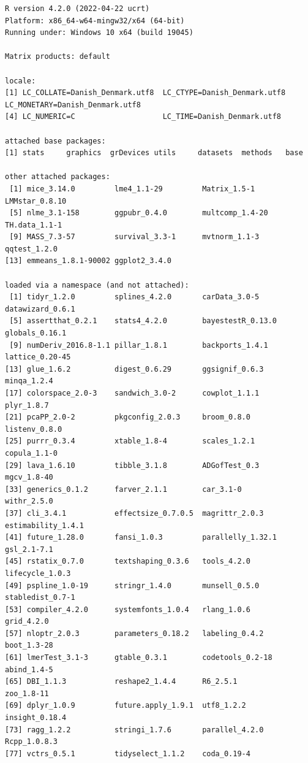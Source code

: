 \documentclass[12pt]{article}
\begin{document}
\begin{verbatim}
R version 4.2.0 (2022-04-22 ucrt)
Platform: x86_64-w64-mingw32/x64 (64-bit)
Running under: Windows 10 x64 (build 19045)

Matrix products: default

locale:
[1] LC_COLLATE=Danish_Denmark.utf8  LC_CTYPE=Danish_Denmark.utf8    LC_MONETARY=Danish_Denmark.utf8
[4] LC_NUMERIC=C                    LC_TIME=Danish_Denmark.utf8    

attached base packages:
[1] stats     graphics  grDevices utils     datasets  methods   base     

other attached packages:
 [1] mice_3.14.0         lme4_1.1-29         Matrix_1.5-1        LMMstar_0.8.10     
 [5] nlme_3.1-158        ggpubr_0.4.0        multcomp_1.4-20     TH.data_1.1-1      
 [9] MASS_7.3-57         survival_3.3-1      mvtnorm_1.1-3       qqtest_1.2.0       
[13] emmeans_1.8.1-90002 ggplot2_3.4.0      

loaded via a namespace (and not attached):
 [1] tidyr_1.2.0         splines_4.2.0       carData_3.0-5       datawizard_0.6.1   
 [5] assertthat_0.2.1    stats4_4.2.0        bayestestR_0.13.0   globals_0.16.1     
 [9] numDeriv_2016.8-1.1 pillar_1.8.1        backports_1.4.1     lattice_0.20-45    
[13] glue_1.6.2          digest_0.6.29       ggsignif_0.6.3      minqa_1.2.4        
[17] colorspace_2.0-3    sandwich_3.0-2      cowplot_1.1.1       plyr_1.8.7         
[21] pcaPP_2.0-2         pkgconfig_2.0.3     broom_0.8.0         listenv_0.8.0      
[25] purrr_0.3.4         xtable_1.8-4        scales_1.2.1        copula_1.1-0       
[29] lava_1.6.10         tibble_3.1.8        ADGofTest_0.3       mgcv_1.8-40        
[33] generics_0.1.2      farver_2.1.1        car_3.1-0           withr_2.5.0        
[37] cli_3.4.1           effectsize_0.7.0.5  magrittr_2.0.3      estimability_1.4.1 
[41] future_1.28.0       fansi_1.0.3         parallelly_1.32.1   gsl_2.1-7.1        
[45] rstatix_0.7.0       textshaping_0.3.6   tools_4.2.0         lifecycle_1.0.3    
[49] pspline_1.0-19      stringr_1.4.0       munsell_0.5.0       stabledist_0.7-1   
[53] compiler_4.2.0      systemfonts_1.0.4   rlang_1.0.6         grid_4.2.0         
[57] nloptr_2.0.3        parameters_0.18.2   labeling_0.4.2      boot_1.3-28        
[61] lmerTest_3.1-3      gtable_0.3.1        codetools_0.2-18    abind_1.4-5        
[65] DBI_1.1.3           reshape2_1.4.4      R6_2.5.1            zoo_1.8-11         
[69] dplyr_1.0.9         future.apply_1.9.1  utf8_1.2.2          insight_0.18.4     
[73] ragg_1.2.2          stringi_1.7.6       parallel_4.2.0      Rcpp_1.0.8.3       
[77] vctrs_0.5.1         tidyselect_1.1.2    coda_0.19-4
\end{verbatim}
\end{document}
